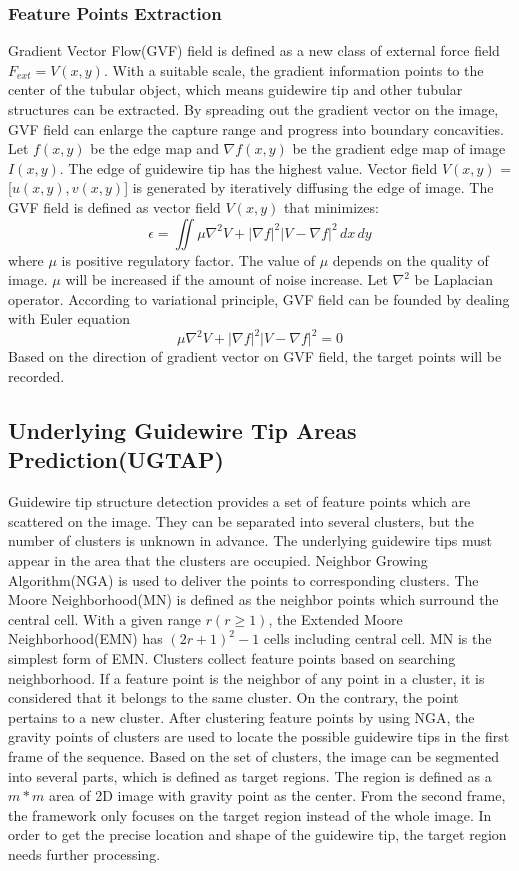 \documentclass[letterpaper, 10 pt, conference]{ieeeconf}  %
\begin{document}
\subsubsection{Feature Points Extraction}
Gradient Vector Flow(GVF) field is defined as a new class of external force field $F_{ext} = V(x,y)$. With a suitable scale, the gradient information points to the center of the tubular object, which means guidewire tip and other tubular structures can be extracted.
By spreading out the gradient vector on the image, GVF field can enlarge the capture range and progress into boundary concavities. Let $f(x,y)$ be the edge map and $\nabla$$f(x,y)$ be the gradient edge map of image $I(x,y)$. The edge of guidewire tip has the highest value. Vector field $V(x,y)$ = [$u(x,y),v(x,y)$] is generated by iteratively diffusing the edge of image. The GVF field is defined as vector field $V(x,y)$ that minimizes:
\begin{equation}{
\epsilon = \iint \mu\nabla^{2}V+|\nabla f|^{2}|V-\nabla f|^{2} \,dx \,dy}
\end{equation}
where $\mu$ is positive regulatory factor. The value of $\mu$ depends on the quality of image. $\mu$ will be increased if the amount of noise increase. 
Let $\nabla^{2}$ be Laplacian operator. According to variational principle, GVF field can be founded by dealing with Euler equation
\begin{equation}{
\mu\nabla^{2}V+|\nabla f|^{2}|V-\nabla f|^{2}=0}
\end{equation}
Based on the direction of gradient vector on GVF field, the target points will be recorded.

\subsection{Underlying Guidewire Tip Areas Prediction(UGTAP)}

Guidewire tip structure detection provides a set of feature points which are scattered on the image. They can be separated into several clusters, but the number of clusters is unknown in advance. The underlying guidewire tips must appear in the area that the clusters are occupied. Neighbor Growing Algorithm(NGA) is used to deliver the points to corresponding clusters. The Moore Neighborhood(MN) is defined as the neighbor points which surround the central cell. With a given range $r (r \geq  1)$, the Extended Moore Neighborhood(EMN) has $(2r+1)^2-1$ cells including central cell. MN is the simplest form of EMN.
Clusters collect feature points based on searching neighborhood. If a feature point is the neighbor of any point in a cluster, it is considered that it belongs to the same cluster. On the contrary, the point pertains to a new cluster. After clustering feature points by using NGA, the gravity points of clusters are used to locate the possible guidewire tips in the first frame of the sequence. Based on the set of clusters, the image can be segmented into several parts, which is defined as target regions. The region is defined as a $m*m$ area of 2D image with gravity point as the center. From the second frame, the framework only focuses on the target region instead of the whole image. In order to get the precise location and shape of the guidewire tip, the target region needs further processing.
\end{document}
